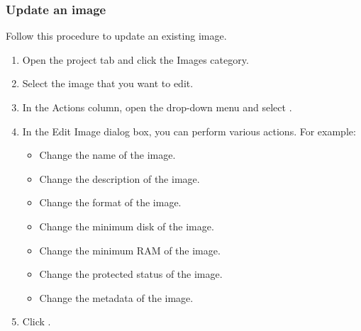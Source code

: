 \subsubsection{Update an image}
Follow this procedure to update an existing image.

\begin{enumerate}
\item Open the project tab and click the Images category.
\item Select the image that you want to edit.
\item In the Actions column, open the drop-down menu and select
  .
\item In the Edit Image dialog box, you can perform various
  actions. For example:
  \begin{itemize}
  \item    Change the name of the image.
  \item    Change the description of the image.
  \item    Change the format of the image.
  \item    Change the minimum disk of the image.
  \item    Change the minimum RAM of the image.
  \item    Change the protected status of the image.
  \item    Change the metadata of the image.
  \end{itemize}
\item  Click .
\end{enumerate}

